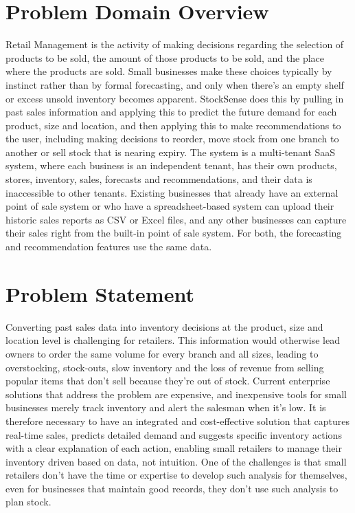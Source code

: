 \documentclass{StockSense}
\begin{document}
\section{Problem Domain Overview}

Retail Management is the activity of making decisions regarding the selection of products to be sold, the amount of those products to be sold, and the place where the products are sold. Small businesses make these choices typically by instinct rather than by formal forecasting, and only when there's an empty shelf or excess unsold inventory becomes apparent. StockSense does this by pulling in past sales information and applying this to predict the future demand for each product, size and location, and then applying this to make recommendations to the user, including making decisions to reorder, move stock from one branch to another or sell stock that is nearing expiry. The system is a multi-tenant SaaS system, where each business is an independent tenant, has their own products, stores, inventory, sales, forecasts and recommendations, and their data is inaccessible to other tenants. Existing businesses that already have an external point of sale system or who have a spreadsheet-based system can upload their historic sales reports as CSV or Excel files, and any other businesses can capture their sales right from the built-in point of sale system. For both, the forecasting and recommendation features use the same data.

\section{Problem Statement}

Converting past sales data into inventory decisions at the product, size and location level is challenging for retailers. This information would otherwise lead owners to order the same volume for every branch and all sizes, leading to overstocking, stock-outs, slow inventory and the loss of revenue from selling popular items that don't sell because they're out of stock. Current enterprise solutions that address the problem are expensive, and inexpensive tools for small businesses merely track inventory and alert the salesman when it's low. It is therefore necessary to have an integrated and cost-effective solution that captures real-time sales, predicts detailed demand and suggests specific inventory actions with a clear explanation of each action, enabling small retailers to manage their inventory driven based on data, not intuition. One of the challenges is that small retailers don't have the time or expertise to develop such analysis for themselves, even for businesses that maintain good records, they don't use such analysis to plan stock.
\end{document}
